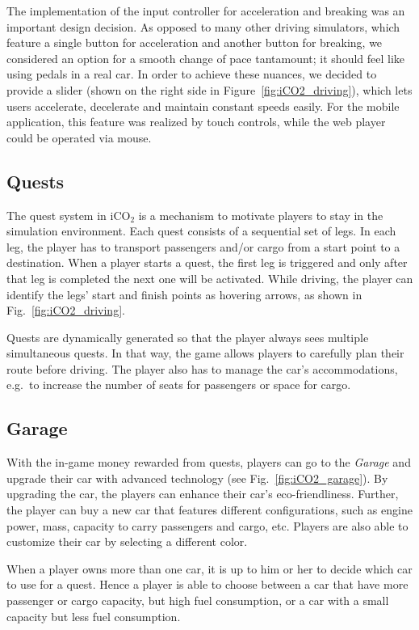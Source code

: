 \documentclass[preprint,authoryear,12pt]{elsarticle}
\begin{document}
The implementation of the input controller for acceleration and breaking was an important design decision. As opposed to many other driving simulators, which feature a single button for acceleration and another button for breaking, we considered an option for a smooth change of pace tantamount; it should feel like using pedals in a real car. In order to achieve these nuances, we decided to provide a slider (shown on the right side in Figure~\ref{fig:iCO2_driving}), which lets users accelerate, decelerate and maintain constant speeds easily. For the mobile application, this feature was realized by touch controls, while the web player could be operated via mouse.


\subsection{Quests}
\label{subsec:quests}

The quest system in iCO$_2$ is a mechanism to motivate players to stay in the simulation environment. Each quest consists of a sequential set of legs. In each leg, the player has to transport passengers and/or cargo from a start point to a destination. When a player starts a quest, the first leg is triggered and only after that leg is completed the next one will be activated. While driving, the player can identify the legs' start and finish points as hovering arrows, as shown in Fig.~\ref{fig:iCO2_driving}.

Quests are dynamically generated so that the player always sees multiple simultaneous quests. In that way, the game allows players to carefully plan their route before driving. The player also has to manage the car's accommodations, e.g.~to increase the number of seats for passengers or space for cargo.

\subsection{Garage}

With the in-game money rewarded from quests, players can go to the \textit{Garage} and upgrade their car with advanced technology (see Fig.~\ref{fig:iCO2_garage}). By upgrading the car, the players can enhance their car's eco-friendliness. Further, the player can buy a new car that features different configurations, such as engine power, mass, capacity to carry passengers and cargo, etc. Players are also able to customize their car by selecting a different color.

When a player owns more than one car, it is up to him or her to decide which car to use for a quest. Hence a player is able to choose between a car that have more passenger or cargo capacity, but high fuel consumption, or a car with a small capacity but less fuel consumption.
\end{document}
